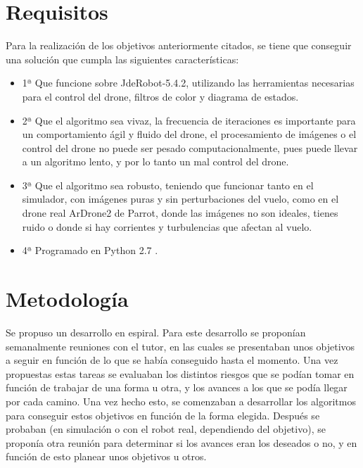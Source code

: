 \section{Requisitos}
\hspace{1 cm} Para la realizaci\'on de los objetivos anteriormente citados, se tiene que conseguir una soluci\'on que cumpla las siguientes caracter\'isticas:
\begin{itemize}
\item 1ª Que funcione sobre JdeRobot-5.4.2, utilizando las herramientas necesarias para el control del drone, filtros de color y diagrama de estados. 
\item 2ª Que el algoritmo sea vivaz, la frecuencia de iteraciones es importante para un comportamiento \'agil y fluido del drone, el procesamiento de im\'agenes o el control del drone no puede ser pesado computacionalmente, pues puede llevar a un algoritmo lento, y por lo tanto un mal control del drone. 
\item 3ª Que el algoritmo sea robusto, teniendo que funcionar tanto en el simulador, con im\'agenes puras y sin perturbaciones del vuelo, como en el drone real ArDrone2 de Parrot, donde las im\'agenes no son ideales, tienes ruido o donde si hay corrientes y turbulencias que afectan al vuelo.
\item 4ª Programado en Python 2.7 . 
\end{itemize}

\section{Metodolog\'ia}

\hspace{1 cm}Se propuso un desarrollo en espiral. Para este desarrollo se propon\'ian semanalmente reuniones con el tutor, en las cuales se presentaban unos objetivos a seguir en funci\'on de lo que se hab\'ia conseguido hasta el momento. Una vez propuestas estas tareas se evaluaban los distintos riesgos que se pod\'ian tomar en funci\'on de trabajar de una forma u otra, y los avances a los que se pod\'ia llegar por cada camino. Una vez hecho esto, se comenzaban a desarrollar los algoritmos para conseguir estos objetivos en funci\'on de la forma elegida. Despu\'es se probaban (en simulaci\'on o con el robot real, dependiendo del objetivo), se propon\'ia otra reuni\'on para determinar si los avances eran los deseados o no, y en funci\'on de esto planear unos objetivos u otros.  

